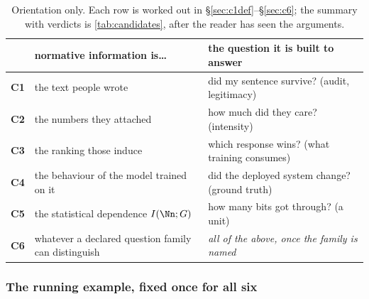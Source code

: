 \begin{table}[H]\centering\small
\begin{tabularx}{\textwidth}{P{1.0cm}P{3.4cm}Y}
\toprule
& \textbf{normative information is\dots} & \textbf{the question it is built to answer}\\
\midrule
\textbf{C1} & the text people wrote & did my sentence survive? (audit, legitimacy)\\
\textbf{C2} & the numbers they attached & how much did they care? (intensity)\\
\textbf{C3} & the ranking those induce & which response wins? (what training consumes)\\
\textbf{C4} & the behaviour of the model trained on it & did the deployed system change? (ground truth)\\
\textbf{C5} & the statistical dependence $I(\Nn;G)$ & how many bits got through? (a unit)\\
\midrule
\textbf{C6} & whatever a declared question family can distinguish & \emph{all of the above, once the family is named}\\
\bottomrule
\end{tabularx}
\caption{Orientation only. Each row is worked out in
§\ref{sec:c1def}--§\ref{sec:c6}; the summary with verdicts is
\cref{tab:candidates}, after the reader has seen the arguments.}
\end{table}

\subsubsection{The running example, fixed once for all six}
\label{sec:running}


